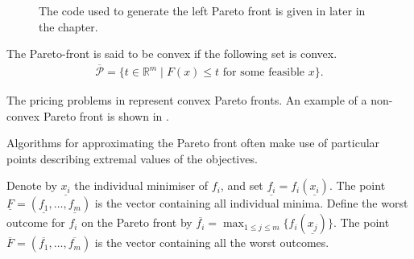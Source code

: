 \documentclass[main.tex]{subfiles}
\begin{document}
\begin{example}
\begin{figure}[htbp]
{      The code used to generate the left Pareto front is given in
       later in the chapter.
    }\label{fig:pareto_std_prof_rev}
  \end{figure}
\end{example}

\begin{mydef}[Convexity]
  The Pareto-front is said to be convex if the following set is convex.
  \begin{align}
    \overline{\mathcal{P}} = \{t\in\mathbb{R}^m\mid F(x)\leq t \text{ for
    some feasible } x\}.
  \end{align}
\end{mydef}

\begin{example}[Convexity]
  The pricing problems in  represent convex Pareto
  fronts.
  An example of a non-convex Pareto front is shown in
  .
\end{example}

Algorithms for approximating the Pareto front
often make use of particular points describing extremal
values of the objectives.
\begin{mydef}
  Denote by $\underline{x_i}$ the individual minimiser of $f_i$, and
  set $\underline{f_i}=f_i(\underline {x_i})$.
  The point $\underline{F}=(\underline{f_1},\dots,\underline{f_m})$
  is the vector containing all individual minima.
  Define the worst outcome for $f_i$ on the Pareto front by
  $\overline{f_i}=\max_{1\leq j\leq m}\{f_i(\underline{x_j})\}$.
  The point  $\overline{F} =
  (\overline{f_1}, \dots, \overline{f_m})$ is the vector containing
  all the worst outcomes.
\end{mydef}
\end{document}
